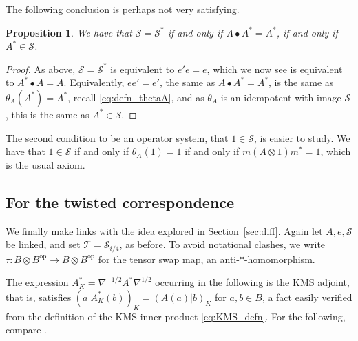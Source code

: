 \documentclass[a4paper,11pt]{article}
\theoremstyle{plain}
\newtheorem{proposition}{Proposition}[section]
\theoremstyle{remark}
\newcommand{\mc}[1]{\mathcal{#1}}
\newcommand{\op}{{\operatorname{op}}}
\begin{document}
The following conclusion is perhaps not very satisfying.

\begin{proposition}
We have that $\mc S = \mc S^*$ if and only if $A \bullet A^* = A^*$, if and only if $A^*\in\mc S$.
\end{proposition}
\begin{proof}
As above, $\mc S= \mc S^*$ is equivalent to $e'e=e$, which we now see is equivalent to $A^* \bullet A = A$.  Equivalently, $ee'=e'$, the same as $A \bullet A^* = A^*$, is the same as $\theta_A(A^*) = A^*$, recall \eqref{eq:defn_thetaA}, and as $\theta_A$ is an idempotent with image $\mc S$, this is the same as $A^* \in \mc S$.
\end{proof}

The second condition to be an operator system, that $1\in\mc S$, is easier to study.  We have that $1\in\mc S$ if and only if $\theta_A(1)=1$ if and only if $m(A\otimes 1)m^* = 1$, which is the usual axiom.


\subsection{For the twisted correspondence}\label{sec:twisted_corr}

We finally make links with the idea explored in Section~\ref{sec:diff}.  Again let $A, e, \mc S$ be linked, and set $\mc T = \mc S_{i/4}$, as before.
To avoid notational clashes, we write $\tau \colon B\otimes B^\op \to B\otimes B^\op$ for the tensor swap map, an anti-$*$-homomorphism.

The expression $A^*_K = \nabla^{-1/2} A^* \nabla^{1/2}$ occurring in the following is the KMS adjoint, that is, satisfies $(a|A^*_K(b))_K = (A(a)|b)_K$ for $a,b\in B$, a fact easily verified from the definition of the KMS inner-product \eqref{eq:KMS_defn}.
For the following, compare \cite[Theorem~A]{Wasilewski_Quantum_Cayley}.
\end{document}
